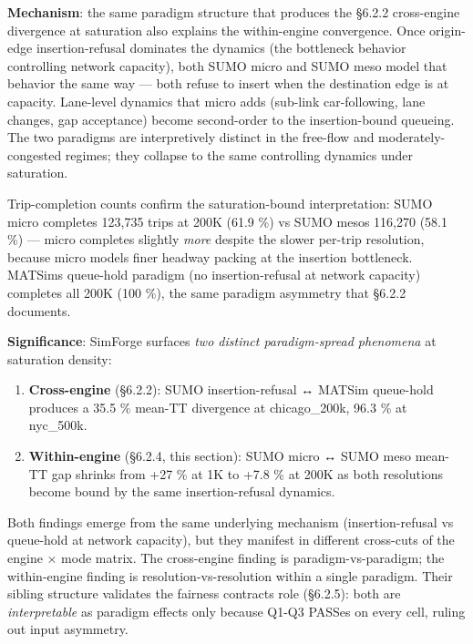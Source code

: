\textbf{Mechanism}: the same paradigm structure that produces the §6.2.2
cross-engine divergence at saturation also explains the within-engine
convergence. Once origin-edge insertion-refusal dominates the dynamics
(the bottleneck behavior controlling network capacity), both SUMO micro
and SUMO meso model that behavior the same way --- both refuse to insert
when the destination edge is at capacity. Lane-level dynamics that micro
adds (sub-link car-following, lane changes, gap acceptance) become
second-order to the insertion-bound queueing. The two paradigms are
interpretively distinct in the free-flow and moderately-congested
regimes; they collapse to the same controlling dynamics under
saturation.

Trip-completion counts confirm the saturation-bound interpretation: SUMO
micro completes 123,735 trips at 200K (61.9 \%) vs SUMO
meso\textquotesingle s 116,270 (58.1 \%) --- micro completes slightly
\emph{more} despite the slower per-trip resolution, because micro models
finer headway packing at the insertion bottleneck.
MATSim\textquotesingle s queue-hold paradigm (no insertion-refusal at
network capacity) completes all 200K (100 \%), the same paradigm
asymmetry that §6.2.2 documents.

\textbf{Significance}: SimForge surfaces \emph{two distinct
paradigm-spread phenomena} at saturation density:

\begin{enumerate}
\def\labelenumi{\arabic{enumi}.}
\tightlist
\item
  \textbf{Cross-engine} (§6.2.2): SUMO insertion-refusal ↔ MATSim
  queue-hold produces a 35.5 \% mean-TT divergence at chicago\_200k,
  96.3 \% at nyc\_500k.
\item
  \textbf{Within-engine} (§6.2.4, this section): SUMO micro ↔ SUMO meso
  mean-TT gap shrinks from +27 \% at 1K to +7.8 \% at 200K as both
  resolutions become bound by the same insertion-refusal dynamics.
\end{enumerate}

Both findings emerge from the same underlying mechanism
(insertion-refusal vs queue-hold at network capacity), but they manifest
in different cross-cuts of the engine × mode matrix. The cross-engine
finding is paradigm-vs-paradigm; the within-engine finding is
resolution-vs-resolution within a single paradigm. Their sibling
structure validates the fairness contract\textquotesingle s role
(§6.2.5): both are \emph{interpretable} as paradigm effects only because
Q1-Q3 PASSes on every cell, ruling out input asymmetry.

